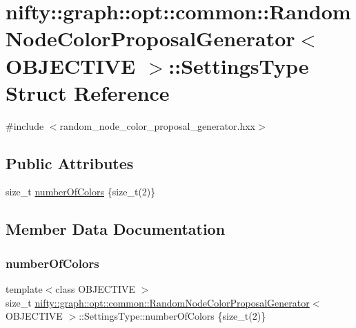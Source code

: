 \hypertarget{structnifty_1_1graph_1_1opt_1_1common_1_1RandomNodeColorProposalGenerator_1_1SettingsType}{}\section{nifty\+:\+:graph\+:\+:opt\+:\+:common\+:\+:Random\+Node\+Color\+Proposal\+Generator$<$ O\+B\+J\+E\+C\+T\+I\+VE $>$\+:\+:Settings\+Type Struct Reference}
\label{structnifty_1_1graph_1_1opt_1_1common_1_1RandomNodeColorProposalGenerator_1_1SettingsType}


{\ttfamily \#include $<$random\+\_\+node\+\_\+color\+\_\+proposal\+\_\+generator.\+hxx$>$}

\subsection*{Public Attributes}
\begin{DoxyCompactItemize}
\item 
size\+\_\+t \hyperlink{structnifty_1_1graph_1_1opt_1_1common_1_1RandomNodeColorProposalGenerator_1_1SettingsType_a1e14b2cc671ef247a649c8637c2ea707}{number\+Of\+Colors} \{size\+\_\+t(2)\}
\end{DoxyCompactItemize}


\subsection{Member Data Documentation}
\mbox{\label{structnifty_1_1graph_1_1opt_1_1common_1_1RandomNodeColorProposalGenerator_1_1SettingsType_a1e14b2cc671ef247a649c8637c2ea707}} 
\subsubsection{\texorpdfstring{number\+Of\+Colors}{numberOfColors}}
{\footnotesize\ttfamily template$<$class O\+B\+J\+E\+C\+T\+I\+VE $>$ \\
size\+\_\+t \hyperlink{classnifty_1_1graph_1_1opt_1_1common_1_1RandomNodeColorProposalGenerator}{nifty\+::graph\+::opt\+::common\+::\+Random\+Node\+Color\+Proposal\+Generator}$<$ O\+B\+J\+E\+C\+T\+I\+VE $>$\+::Settings\+Type\+::number\+Of\+Colors \{size\+\_\+t(2)\}}



